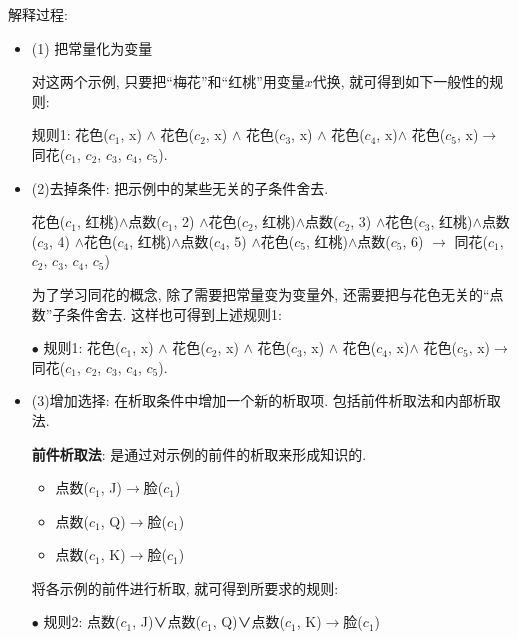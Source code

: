 解释过程:
\begin{itemize}
\item (1) 把常量化为变量
\begin{example}
对这两个示例, 只要把“梅花”和“红桃”用变量$x$代换, 就可得到如下一般性的规则:

    规则1: 花色($c_1$, x) $\wedge$ 花色($c_2$, x) $\wedge$ 花色($c_3$, x) $\wedge$ 花色($c_4$, x)$\wedge$ 花色($c_5$, x)$\rightarrow$ 同花($c_1$, $c_2$, $c_3$, $c_4$, $c_5$).
\end{example}

\item (2)去掉条件: 把示例中的某些无关的子条件舍去.

\begin{example}
  花色($c_1$, 红桃)$\wedge$点数($c_1$, 2)
            $\wedge$花色($c_2$, 红桃)$\wedge$点数($c_2$, 3)
            $\wedge$花色($c_3$, 红桃)$\wedge$点数($c_3$, 4)
            $\wedge$花色($c_4$, 红桃)$\wedge$点数($c_4$, 5)
            $\wedge$花色($c_5$, 红桃)$\wedge$点数($c_5$, 6)
          $\rightarrow$ 同花($c_1$, $c_2$, $c_3$, $c_4$, $c_5$)
\end{example}

为了学习同花的概念, 除了需要把常量变为变量外, 还需要把与花色无关的“点数”子条件舍去. 这样也可得到上述规则1:

$\bullet$ 规则1: 花色($c_1$, x) $\wedge$ 花色($c_2$, x) $\wedge$ 花色($c_3$, x) $\wedge$ 花色($c_4$, x)$\wedge$ 花色($c_5$, x)$\rightarrow$ 同花($c_1$, $c_2$, $c_3$, $c_4$, $c_5$).

\item (3)增加选择: 在析取条件中增加一个新的析取项. 包括前件析取法和内部析取法.

\textbf{前件析取法}: 是通过对示例的前件的析取来形成知识的.

\begin{example}
\begin{itemize}
\item 点数($c_1$, J)$\rightarrow$脸($c_1$)
\item 点数($c_1$, Q)$\rightarrow$脸($c_1$)
\item 点数($c_1$, K)$\rightarrow$脸($c_1$)
\end{itemize}

将各示例的前件进行析取, 就可得到所要求的规则:

 $\bullet$ 规则2: 点数($c_1$, J)∨点数($c_1$, Q)∨点数($c_1$, K)$\rightarrow$脸($c_1$)
\end{example}


\end{itemize}

